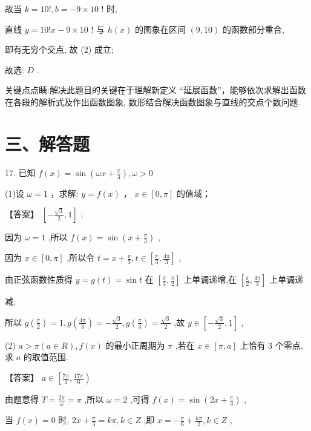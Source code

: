 \documentclass[10pt]{article}
\begin{document}
故当 \(k = {10}!,b =  - 9 \times  {10}\) ! 时,

直线 \(y = {10}!x - 9 \times  {10}\) ! 与 \(h\left( x\right)\) 的图象在区间 \(\left( {9,{10}}\right)\) 的函数部分重合,

即有无穷个交点, 故 (2) 成立;

故选: \(D\) .

关键点点睛:解决此题目的关键在于理解新定义 “延展函数”，能够依次求解出函数在各段的解析式及作出函数图象, 数形结合解决函数图象与直线的交点个数问题.

\section*{三、解答题}

17. 已知 \(f\left( x\right)  = \sin \left( {{\omega x} + \frac{\pi }{3}}\right) ,\omega  > 0\)

(1)设 \(\omega  = 1\) ，求解: \(y = f\left( x\right)\) ， \(x \in  \left\lbrack  {0,\pi }\right\rbrack\) 的值域；

【答案】 \(\left\lbrack  {-\frac{\sqrt{3}}{2},1}\right\rbrack\) ;

因为 \(\omega  = 1\) ,所以 \(f\left( x\right)  = \sin \left( {x + \frac{\pi }{3}}\right)\) ,

因为 \(x \in  \left\lbrack  {0,\pi }\right\rbrack\) ,所以令 \(t = x + \frac{\pi }{3},t \in  \left\lbrack  {\frac{\pi }{3},\frac{4\pi }{3}}\right\rbrack\) ,

由正弦函数性质得 \(y = g\left( t\right)  = \sin t\) 在 \(\left\lbrack  {\frac{\pi }{3},\frac{\pi }{2}}\right\rbrack\) 上单调递增,在 \(\left\lbrack  {\frac{\pi }{2},\frac{4\pi }{3}}\right\rbrack\) 上单调递

减,

所以 \(g\left( \frac{\pi }{2}\right)  = 1,g\left( \frac{4\pi }{3}\right)  =  - \frac{\sqrt{3}}{2},g\left( \frac{\pi }{3}\right)  = \frac{\sqrt{3}}{2}\) ,故 \(y \in  \left\lbrack  {-\frac{\sqrt{3}}{2},1}\right\rbrack\) ,

(2) \(a > \pi \left( {a \in  R}\right) ,f\left( x\right)\) 的最小正周期为 \(\pi\) ,若在 \(x \in  \left\lbrack  {\pi ,a}\right\rbrack\) 上恰有 3 个零点,求 \(a\) 的取值范围.

【答案】 \(a \in  \left\lbrack  {\frac{7\pi }{3},\frac{17\pi }{6}}\right)\)

由题意得 \(T = \frac{2\pi }{\omega } = \pi\) ,所以 \(\omega  = 2\) ,可得 \(f\left( x\right)  = \sin \left( {{2x} + \frac{\pi }{3}}\right)\) ,

当 \(f\left( x\right)  = 0\) 时, \({2x} + \frac{\pi }{3} = {k\pi },k \in  Z\) ,即 \(x =  - \frac{\pi }{6} + \frac{k\pi }{2},k \in  Z\) ,
\end{document}
